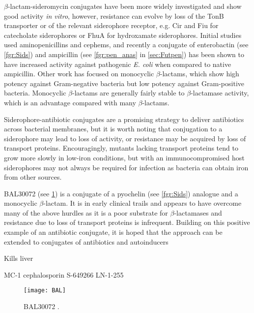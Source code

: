 $\beta$-lactam-sideromycin conjugates have been more widely investigated\cite{Page2013} and show good activity \textit{in vitro}, however, resistance can evolve by loss of the TonB transporter or of the relevant siderophore receptor, e.g. Cir and Fiu for catecholate siderophores or FhuA for hydroxamate siderophores. Initial studies used aminopenicillins and cephems, and recently a conjugate of enterobactin (see \ref{fgr:Sids}) and ampicillin (see \ref{fgr:pen_anas} in \ref{sec:Futpen}) has been shown to have increased activity against pathogenic \textit{E. coli} when compared to native ampicillin\cite{Zheng2014}. Other work has focused on monocyclic $\beta$-lactams, which show high potency against Gram-negative bacteria but low potency against Gram-positive bacteria\cite{Zurenko1990}. Monocyclic $\beta$-lactams are generally fairly stable to $\beta$-lactamase activity, which is an advantage compared with many $\beta$-lactams. 

Siderophore-antibiotic conjugates are a promising strategy to deliver antibiotics across bacterial membranes, but it is worth noting that conjugation to a siderophore may lead to loss of activity, or resistance may be acquired by loss of transport proteins. Encouragingly, mutants lacking transport proteins tend to grow more slowly in low-iron conditions, but with an immunocompromised host siderophores may not always be required for infection as bacteria can obtain iron from other sources\cite{Takase2000}. 

BAL30072  (see \ref{fgr:BAL}) is a conjugate of a pyochelin  (see \ref{fgr:Sids}) analogue and a monocyclic $\beta$-lactam. It is in early clinical trails and appears to have overcome many of the above hurdles as it is a poor substrate for $\beta$-lactamases and resistance due to loss of transport proteins is infrequent\cite{Page2013}. Building on this positive example of an antibiotic conjugate, it is hoped that the approach can be extended to conjugates of antibiotics and autoinducers

Kills liver\cite{Paech2017}

MC-1\cite{Schalk2017,Tillotson2016}
cephalosporin S-649266\cite{Ito2018}
LN-1-255\cite{Pattanaik2009,Bou2010}

\begin{figure}[H]
	\begin{center}
		\texttt{[image: BAL]}
		\caption{BAL30072 . \label{fgr:BAL}}
	\end{center}
\end{figure}



